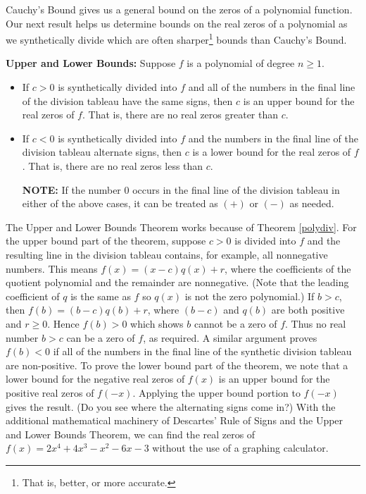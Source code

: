 Cauchy's Bound gives us a general bound on the zeros of a polynomial function.  Our next result helps us determine bounds on the real zeros of a polynomial as we synthetically divide which are often sharper\footnote{That is, better, or more accurate.} bounds than Cauchy's Bound.   

\smallskip

\colorbox{ResultColor}{\bbm
\begin{thm}  \label{ULbounds} \textbf{Upper and Lower Bounds:}  Suppose $f$ is a polynomial of degree $n \geq 1$. 

\begin{itemize}

\item  If $c > 0$ is synthetically divided into $f$ and all of the numbers in the final line of the division tableau have the same signs, then $c$ is an upper bound for the real zeros of $f$.  That is, there are no real zeros greater than $c$.

\item  If $c < 0$ is synthetically divided into $f$ and the numbers in the final line of the division tableau alternate signs, then $c$ is a lower bound for the real zeros of $f$.  That is, there are no real zeros less than $c$.

\textbf{NOTE:}  If the number $0$ occurs in the final line of the division tableau in either of the above cases, it can be treated as $(+)$ or $(-)$ as needed.

\end{itemize}

\end{thm}
\ebm}


\smallskip

The Upper and Lower Bounds Theorem works because of Theorem \ref{polydiv}.  For the upper bound part of the theorem, suppose $c>0$ is divided into $f$ and the resulting line in the division tableau contains, for example, all nonnegative numbers.  This means $f(x) = (x-c) q(x) + r$, where the coefficients of the quotient polynomial and the remainder are nonnegative.  (Note that the leading coefficient of $q$ is the same as $f$ so $q(x)$ is not the zero polynomial.)  If $b > c$, then $f(b) = (b-c) q(b) + r$, where $(b-c)$ and  $q(b)$ are both positive and $r \geq 0$.  Hence $f(b) > 0$ which shows $b$ cannot be a zero of $f$.  Thus no real number $b > c$ can be a zero of $f$, as required.  A similar argument proves $f(b) < 0$ if all of the numbers in the final line of the synthetic division tableau are non-positive.  To prove the lower bound part of the theorem, we note that a lower bound for the negative real zeros of $f(x)$ is an upper bound for the positive real zeros of $f(-x)$.  Applying the upper bound portion to $f(-x)$ gives the result.  (Do you see where the alternating signs come in?) With the additional mathematical machinery of Descartes' Rule of Signs and the Upper and Lower Bounds Theorem, we can find the real zeros of $f(x) = 2x^4+4x^3-x^2-6x-3$ without the use of a graphing calculator.

